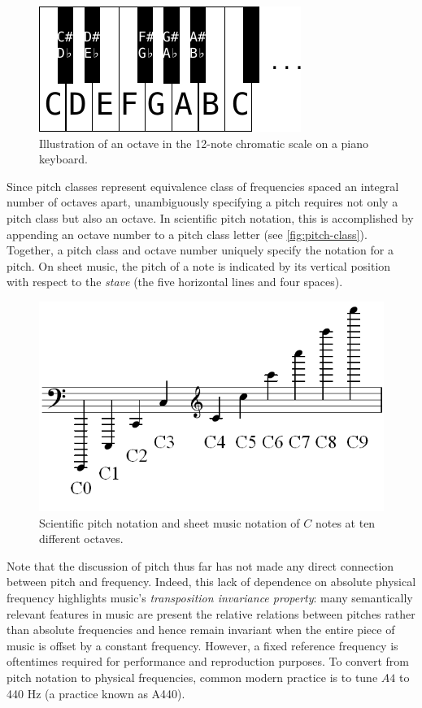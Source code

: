 \begin{figure}[htpb]
    \centering
    \includegraphics[width=0.6\linewidth]{Figures/piano-keys.pdf}
    \caption{Illustration of an octave in the 12-note chromatic scale
        on a piano keyboard.}
    \label{fig:piano-keys}
\end{figure}

Since pitch classes represent equivalence class of frequencies spaced an
integral number of octaves apart, unambiguously specifying a pitch requires not
only a pitch class but also an octave. In scientific pitch notation, this is
accomplished by appending an octave number to a pitch class letter (see
\autoref{fig:pitch-class}). Together, a pitch class and octave number uniquely
specify the notation for a pitch. On sheet music, the pitch of a note is
indicated by its vertical position with respect to the \emph{stave} (the five
horizontal lines and four spaces).

\begin{figure}[htpb]
    \centering
    \includegraphics[width=0.6\linewidth]{Figures/Pitch_notation.png}
    \caption{Scientific pitch notation and sheet music notation of $C$ notes at
    ten different octaves.  }
    \label{fig:pitch-class}
\end{figure}

Note that the discussion of pitch thus far has not made any direct connection
between pitch and frequency. Indeed, this lack of dependence on absolute
physical frequency highlights music's \emph{transposition invariance property}:
many semantically relevant features in music are present the relative relations
between pitches rather than absolute frequencies and hence remain invariant
when the entire piece of music is offset by a constant frequency. However, a
fixed reference frequency is oftentimes required for performance and
reproduction purposes. To convert from pitch notation to physical frequencies,
common modern practice is to tune $A4$ to 440 Hz (a practice known as A440).

